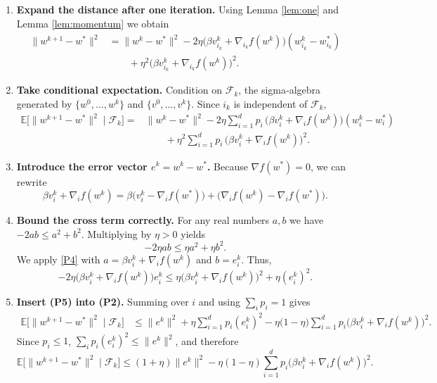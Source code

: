 \documentclass{article}
\newcommand{\E}{\mathbb{E}}
\begin{document}
\begin{enumerate}[label=[Step \arabic*], leftmargin=*]
\item \textbf{Expand the distance after one iteration.}  
Using Lemma \ref{lem:one} and Lemma \ref{lem:momentum} we obtain
\[
\begin{aligned}
\|w^{k+1}-w^{*}\|^{2}
&= \|w^{k}-w^{*}\|^{2}
-2\eta\bigl(\beta v_{i_k}^{k}+ \nabla_{i_k}f(w^{k})\bigr)
      (w^{k}_{i_k}-w^{*}_{i_k})\\
&\qquad +\eta^{2}\bigl(\beta v_{i_k}^{k}+ \nabla_{i_k}f(w^{k})\bigr)^{2}.
\end{aligned}
\tag{P1}
\]

\item \textbf{Take conditional expectation.}  
Condition on $\mathcal{F}_{k}$, the sigma‑algebra generated by
$\{w^{0},\dots,w^{k}\}$ and $\{v^{0},\dots,v^{k}\}$. Since $i_k$ is independent
of $\mathcal{F}_{k}$,
\[
\begin{aligned}
\E\!\bigl[\|w^{k+1}-w^{*}\|^{2}\mid\mathcal{F}_{k}\bigr]
=&\|w^{k}-w^{*}\|^{2}
-2\eta\sum_{i=1}^{d}p_i\,
\bigl(\beta v_{i}^{k}+ \nabla_i f(w^{k})\bigr)
      (w^{k}_{i}-w^{*}_{i})\\
&\qquad+\eta^{2}\sum_{i=1}^{d}p_i\,
\bigl(\beta v_{i}^{k}+ \nabla_i f(w^{k})\bigr)^{2}.
\end{aligned}
\tag{P2}
\]

\item \textbf{Introduce the error vector $e^{k}=w^{k}-w^{*}$.}  
Because $\nabla f(w^{*})=0$, we can rewrite
\[
\beta v_{i}^{k}+ \nabla_i f(w^{k})
= \beta\bigl(v_{i}^{k}-\nabla_i f(w^{*})\bigr)
  +\bigl(\nabla_i f(w^{k})-\nabla_i f(w^{*})\bigr).
\tag{P3}
\]

\item \textbf{Bound the cross term correctly.}  
For any real numbers $a,b$ we have $-2ab\le a^{2}+b^{2}$. Multiplying by
$\eta>0$ yields
\[
-2\eta a b\le \eta a^{2}+\eta b^{2}.
\tag{P4}
\]
We apply \eqref{P4} with
$a=\beta v_{i}^{k}+ \nabla_i f(w^{k})$ and $b=e^{k}_{i}$.
Thus,
\[
-2\eta\bigl(\beta v_{i}^{k}+ \nabla_i f(w^{k})\bigr)e^{k}_{i}
\le \eta\bigl(\beta v_{i}^{k}+ \nabla_i f(w^{k})\bigr)^{2}
   +\eta (e^{k}_{i})^{2}.
\tag{P5}
\]

\item \textbf{Insert (P5) into (P2).}  
Summing over $i$ and using $\sum_{i}p_i=1$ gives
\[
\begin{aligned}
\E\!\bigl[\|w^{k+1}-w^{*}\|^{2}\mid\mathcal{F}_{k}\bigr]
&\le \|e^{k}\|^{2}
+\eta\sum_{i=1}^{d}p_i (e^{k}_{i})^{2}
-\eta\bigl(1-\eta\bigr)\sum_{i=1}^{d}p_i
      \bigl(\beta v_{i}^{k}+ \nabla_i f(w^{k})\bigr)^{2}.
\end{aligned}
\tag{P6}
\]
Since $p_i\le1$, $\sum_{i}p_i(e^{k}_{i})^{2}\le\|e^{k}\|^{2}$, and therefore
\[
\E\!\bigl[\|w^{k+1}-w^{*}\|^{2}\mid\mathcal{F}_{k}\bigr]
\le (1+\eta)\|e^{k}\|^{2}
-\eta(1-\eta)\sum_{i=1}^{d}p_i
      \bigl(\beta v_{i}^{k}+ \nabla_i f(w^{k})\bigr)^{2}.
\tag{P7}
\]


\end{enumerate}
\end{document}
